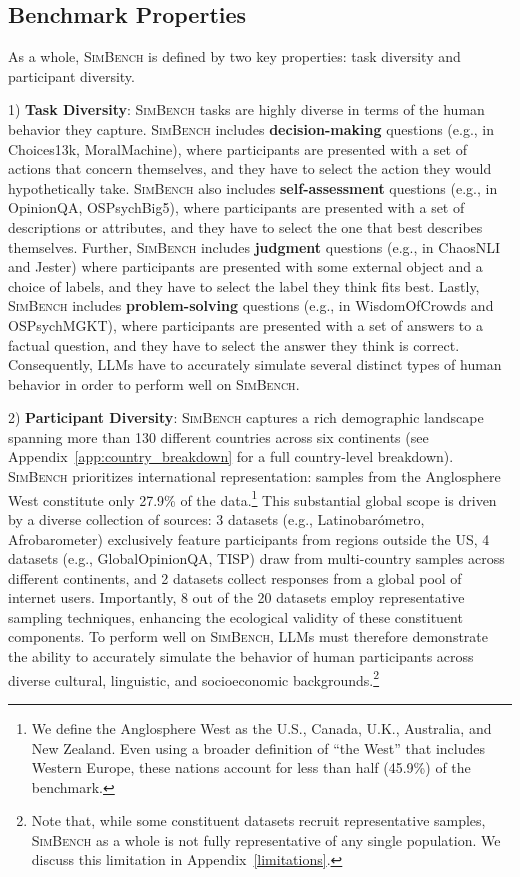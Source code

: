 \documentclass{article} %
\begin{document}
\subsection{Benchmark Properties}
\label{subsec:simbench_properties}

As a whole, \textsc{SimBench} is defined by two key properties: task diversity and participant diversity.

1) \textbf{Task Diversity}:
\textsc{SimBench} tasks are highly diverse in terms of the human behavior they capture.
\textsc{SimBench} includes \textbf{decision-making} questions (e.g., in Choices13k, MoralMachine), where participants are presented with a set of actions that concern themselves, and they have to select the action they would hypothetically take.
\textsc{SimBench} also includes \textbf{self-assessment} questions (e.g., in OpinionQA, OSPsychBig5), where participants are presented with a set of descriptions or attributes, and they have to select the one that best describes themselves.
Further, \textsc{SimBench} includes \textbf{judgment} questions (e.g., in ChaosNLI and Jester) where participants are presented with some external object and a choice of labels, and they have to select the label they think fits best.
Lastly, \textsc{SimBench} includes \textbf{problem-solving} questions (e.g., in WisdomOfCrowds and OSPsychMGKT), where participants are presented with a set of answers to a factual question, and they have to select the answer they think is correct.
Consequently, LLMs have to accurately simulate several distinct types of human behavior in order to perform well on \textsc{SimBench}.

2) \textbf{Participant Diversity}: 
\textsc{SimBench} captures a rich demographic landscape spanning more than 130 different countries across six continents (see Appendix~\ref{app:country_breakdown} for a full country-level breakdown). \textsc{SimBench} prioritizes international representation: samples from the Anglosphere West constitute only 27.9\% of the data.\footnote{We define the Anglosphere West as the U.S., Canada, U.K., Australia, and New Zealand. Even using a broader definition of ``the West'' that includes Western Europe, these nations account for less than half (45.9\%) of the benchmark.} This substantial global scope is driven by a diverse collection of sources:
3 datasets (e.g., Latinobarómetro, Afrobarometer) exclusively feature participants from regions outside the US, 4 datasets (e.g., GlobalOpinionQA, TISP) draw from multi-country samples across different continents, and 2 datasets collect responses from a global pool of internet users.  Importantly, 8 out of the 20 datasets employ representative sampling techniques, enhancing the ecological validity of these constituent components. To perform well on \textsc{SimBench}, LLMs must therefore demonstrate the ability to accurately simulate the behavior of human participants across diverse cultural, linguistic, and socioeconomic backgrounds.\footnote{Note that, while some constituent datasets recruit representative samples, \textsc{SimBench} as a whole is not fully representative of any single population. We discuss this limitation in Appendix~\ref{limitations}.}
\end{document}
